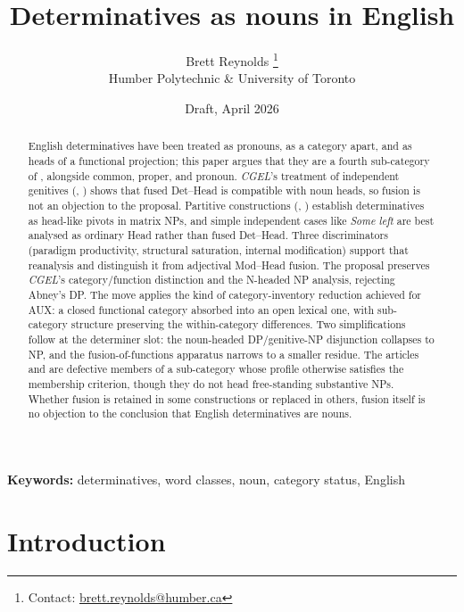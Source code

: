 \documentclass[12pt]{article}
\title{Determinatives as nouns in English}
\author{Brett Reynolds \orcidlink{0000-0003-0073-7195}%
\thanks{Contact: \href{mailto:brett.reynolds@humber.ca}{brett.reynolds@humber.ca}}\\
Humber Polytechnic \& University of Toronto}
\date{Draft, April 2026}
\begin{document}
\maketitle

\begin{abstract}
English determinatives have been treated as pronouns, as a category apart, and as heads of a functional projection; this paper argues that they are a fourth sub-category of , alongside common, proper, and pronoun. \textit{CGEL}'s treatment of independent genitives (, ) shows that fused Det--Head is compatible with noun heads, so fusion is not an objection to the proposal. Partitive constructions (, ) establish determinatives as head-like pivots in matrix NPs, and simple independent cases like \textit{Some left} are best analysed as ordinary Head rather than fused Det--Head. Three discriminators (paradigm productivity, structural saturation, internal modification) support that reanalysis and distinguish it from adjectival Mod--Head fusion. The proposal preserves \textit{CGEL}'s category/function distinction and the N-headed NP analysis, rejecting Abney's DP. The move applies the kind of category-inventory reduction \textcite{pullumwilson1977} achieved for AUX: a closed functional category absorbed into an open lexical one, with sub-category structure preserving the within-category differences. Two simplifications follow at the determiner slot: the noun-headed DP/genitive-NP disjunction collapses to NP, and the fusion-of-functions apparatus narrows to a smaller residue. The articles  and  are defective members of a sub-category whose profile otherwise satisfies the membership criterion, though they do not head free-standing substantive NPs. Whether fusion is retained in some constructions or replaced in others, fusion itself is no objection to the conclusion that English determinatives are nouns.
\end{abstract}

\noindent\textbf{Keywords:} determinatives, word classes, noun, category status, English

\section{Introduction}\label{sec:intro}
\end{document}
